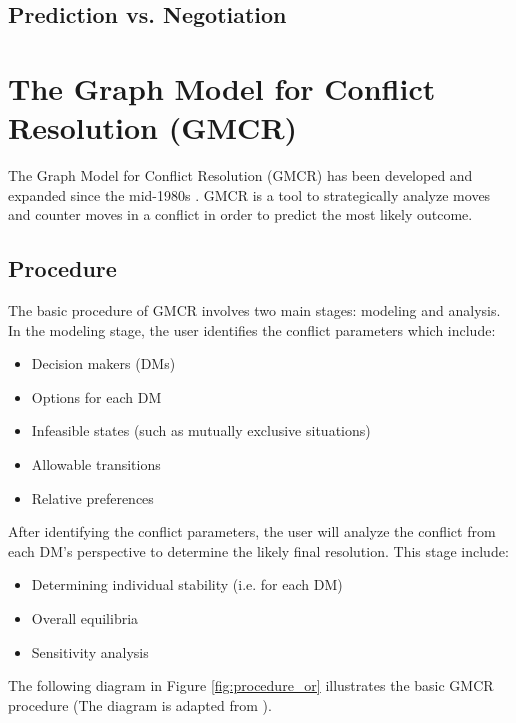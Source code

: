 \documentclass[letterpaper,12pt,titlepage,oneside,final]{book}
\begin{document}
\section{Prediction vs. Negotiation}



\chapter{The Graph Model for Conflict Resolution (GMCR)}
\label{sec:GMCR}
The Graph Model for Conflict Resolution (GMCR) has been developed and expanded since the mid-1980s \citep{kilgour2005}. GMCR is a tool to strategically analyze moves and counter moves in a conflict in order to predict the most likely outcome. 
\section{Procedure}
The basic procedure of GMCR involves two main stages: modeling and analysis. In the modeling stage, the user identifies the conflict parameters which include:
\begin{itemize}
\item Decision makers (DMs)
\item Options for each DM
\item Infeasible states (such as mutually exclusive situations)
\item Allowable transitions
\item Relative preferences
\end{itemize}

After identifying the conflict parameters, the user will analyze the conflict from each DM's perspective to determine the likely final resolution. This stage include:
\begin{itemize}
\item Determining individual stability (i.e. for each DM)
\item Overall equilibria
\item Sensitivity analysis
\end{itemize}

The following diagram in Figure \ref{fig:procedure_or} illustrates the basic GMCR procedure (The diagram is adapted from \citet{fang1993}).
\end{document}
